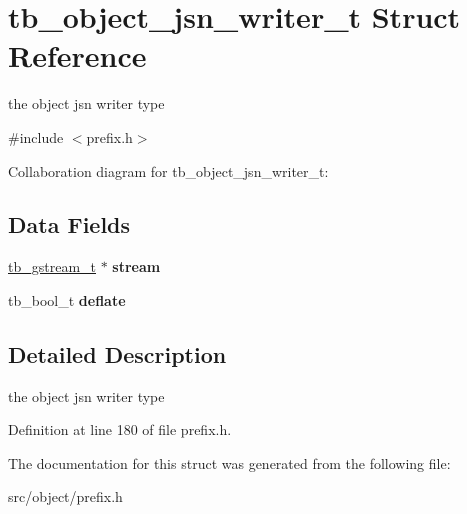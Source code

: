 \hypertarget{structtb__object__jsn__writer__t}{\section{tb\-\_\-object\-\_\-jsn\-\_\-writer\-\_\-t Struct Reference}
\label{d5/d98/structtb__object__jsn__writer__t}
}


the object jsn writer type  




{\ttfamily \#include $<$prefix.\-h$>$}



Collaboration diagram for tb\-\_\-object\-\_\-jsn\-\_\-writer\-\_\-t\-:
\subsection*{Data Fields}
\begin{DoxyCompactItemize}
\item 
\hypertarget{structtb__object__jsn__writer__t_af9cca0977c4bc22607d324bea4bc6be1}{\hyperlink{structtb__gstream__t}{tb\-\_\-gstream\-\_\-t} $\ast$ {\bfseries stream}}\label{d5/d98/structtb__object__jsn__writer__t_af9cca0977c4bc22607d324bea4bc6be1}

\item 
\hypertarget{structtb__object__jsn__writer__t_a2e4e9b1efca6ea12de2ce038c2c3ff11}{tb\-\_\-bool\-\_\-t {\bfseries deflate}}\label{d5/d98/structtb__object__jsn__writer__t_a2e4e9b1efca6ea12de2ce038c2c3ff11}

\end{DoxyCompactItemize}


\subsection{Detailed Description}
the object jsn writer type 

Definition at line 180 of file prefix.\-h.



The documentation for this struct was generated from the following file\-:\begin{DoxyCompactItemize}
\item 
src/object/prefix.\-h\end{DoxyCompactItemize}
